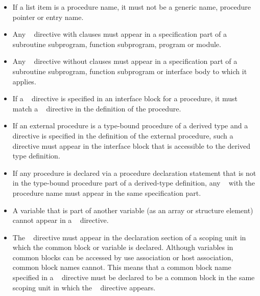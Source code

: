 \fortranspecificstart
\begin{itemize}
\item If a list item is a procedure name, it must not be a generic name, 
      procedure pointer or entry name.

\item Any ~ directive with clauses must appear 
      in a specification part of a subroutine subprogram, function subprogram,
      program or module.

\item Any ~ directive without clauses must appear 
      in a specification part of a subroutine subprogram, function subprogram 
      or interface body to which it applies.

\item If a ~ directive is specified in an 
      interface block for a procedure, it must match a 
      ~ directive in the definition of the 
      procedure.

\item If an external procedure is a type-bound procedure of a derived 
      type and a ~ directive is specified in 
      the definition of the external procedure, such a directive must 
      appear in the interface block that is accessible to the derived 
      type definition.

\item If any procedure is declared via a procedure declaration statement 
      that is not in the type-bound procedure part of a derived-type 
      definition, any ~ with the procedure 
      name must appear in the same specification part.

\item A variable that is part of another variable (as an array or structure 
      element) cannot appear in a ~ directive.

\item The ~ directive must appear in the 
      declaration section of a scoping unit in which the common block 
      or variable is declared. Although variables in common blocks can 
      be accessed by use association or host association, common block 
      names cannot. This means that a common block name specified in a 
      ~ directive must be declared to be a 
      common block in the same scoping unit in which the 
      ~ directive appears.


\end{itemize}
